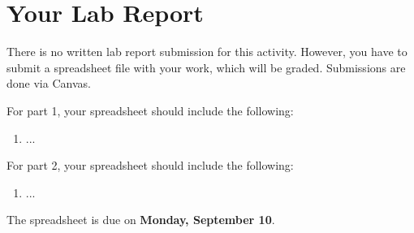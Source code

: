 \section{Your Lab Report}
There is no written lab report submission for this activity. However, you have to submit a spreadsheet file with your work, which will be graded. Submissions are done via Canvas.

For part 1, your spreadsheet should include the following:
\begin{enumerate}
    \item ...
\end{enumerate}
For part 2, your spreadsheet should include the following:
\begin{enumerate}
    \item ...
\end{enumerate}
The spreadsheet is due on \textbf{Monday, September 10}.